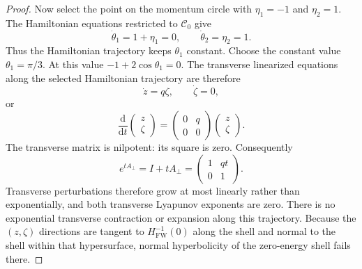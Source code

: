 \documentclass[10pt,a4paper]{amsart}
\newcommand{\C}{\mathcal{C}}
\newcommand{\Hs}{H_{\mathrm{FW}}}
\newcommand{\dd}{\mathrm{d}}
\begin{document}
\begin{proof}
Now select the point on the momentum circle with $\eta_1=-1$ and $\eta_2=1$.  The Hamiltonian equations restricted to $\C_0$ give
\[
\dot\theta_1=1+\eta_1=0,
\qquad
\dot\theta_2=\eta_2=1.
\]
Thus the Hamiltonian trajectory keeps $\theta_1$ constant.  Choose the constant value $\theta_1=\pi/3$.  At this value $-1+2\cos\theta_1=0$.  The transverse linearized equations along the selected Hamiltonian trajectory are therefore
\begin{equation}
\dot z=q\zeta,
\qquad
\dot\zeta=0,
\label{eq:nilpotent-transverse}
\end{equation}
or
\[
\frac{\dd}{\dd t}\begin{pmatrix}z\\ \zeta\end{pmatrix}
=
\begin{pmatrix}0&q\\0&0\end{pmatrix}
\begin{pmatrix}z\\ \zeta\end{pmatrix}.
\]
The transverse matrix is nilpotent: its square is zero.  Consequently
\[
e^{tA_\perp}=I+tA_\perp
=
\begin{pmatrix}1&qt\\0&1\end{pmatrix}.
\]
Transverse perturbations therefore grow at most linearly rather than exponentially, and both transverse Lyapunov exponents are zero.  There is no exponential transverse contraction or expansion along this trajectory.  Because the $(z,\zeta)$ directions are tangent to $\Hs^{-1}(0)$ along the shell and normal to the shell within that hypersurface, normal hyperbolicity of the zero-energy shell fails there.
\end{proof}
\end{document}
